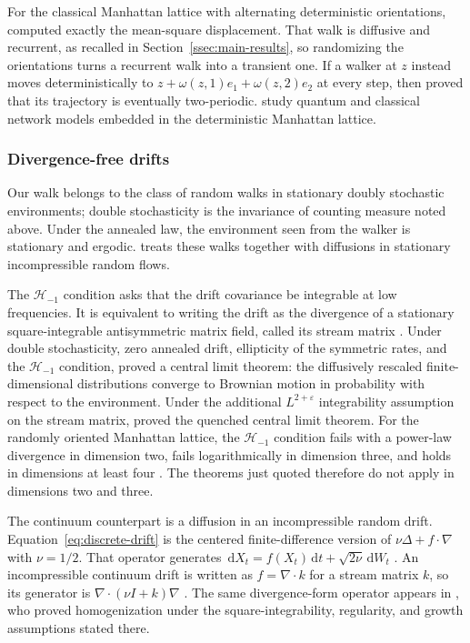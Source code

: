 \documentclass[11pt]{amsart}
\theoremstyle{plain}
\theoremstyle{definition}
\newcommand{\1}{\mathbf 1}
\newcommand{\dd}{\,\mathrm d}
\newcommand{\Hs}{\mathcal H}
\begin{document}
For  the classical Manhattan lattice with  alternating deterministic orientations, \citet*[Theorem~1]{BH23}
computed exactly the mean-square displacement.    That walk is
diffusive and recurrent, as recalled in Section~\ref{ssec:main-results}, so randomizing the orientations turns a recurrent walk into a transient one.  If a walker at $z$ instead moves deterministically to
$z+\omega(z,1)e_1+\omega(z,2)e_2$ at every step, then
\citet*[Theorem~1]{CHT19} proved that its trajectory is eventually
two-periodic.
\citet*[pp.~10251--10254]{BOC03}
study quantum and classical network models embedded in the deterministic
Manhattan lattice.

\subsubsection{Divergence-free drifts}\label{sssec:divfree}

Our walk belongs to the class of random walks in stationary doubly
stochastic environments; double stochasticity is the invariance of counting
measure noted above.
Under the annealed law, the environment seen from the walker is stationary
and ergodic.  \citet*[Sections~1.1--1.2]{Tot18} treats these walks together
with diffusions in stationary incompressible random flows.

The $\Hs_{-1}$ condition asks that the drift covariance be integrable at low
frequencies.  It is equivalent to writing the drift as the divergence of a
stationary square-integrable antisymmetric matrix field, called its stream
matrix \citep*[Proposition~1\textup{(ii)}]{Tot18}.  Under
double stochasticity, zero annealed drift, ellipticity of the symmetric
rates, and the $\Hs_{-1}$ condition, \citet*[Theorem~1]{KT17} proved a central
limit theorem: the diffusively rescaled finite-dimensional distributions
converge to Brownian motion in probability with respect to the environment.  Under the additional
$L^{2+\varepsilon}$ integrability assumption on the stream matrix,
\citet*[Theorem~1\textup{(ii)}]{Tot18Q} proved the quenched central limit
theorem.  For the randomly oriented Manhattan lattice, the $\Hs_{-1}$
condition fails with a power-law divergence in dimension two, fails
logarithmically in dimension three, and holds in dimensions at least four
\citep*[Section~1.4]{Tot18}.  The theorems just quoted therefore do not apply
in dimensions two and three.

The continuum counterpart is a diffusion in an incompressible random drift.
Equation~\eqref{eq:discrete-drift} is the centered finite-difference version
of $\nu\Delta+f\cdot\nabla$ with $\nu=1/2$.  That operator generates
$\dd X_t=f(X_t)\dd t+\sqrt{2\nu}\dd W_t$
\citep*[(1.1)]{ABK26}.  An incompressible continuum drift is
written as $f=\nabla\cdot k$ for a stream matrix $k$, so its
generator is $\nabla\cdot(\nu I+k)\nabla$
\citep*[(1.9)]{ABK26}.  The same divergence-form operator appears in
\citet*[Theorem~1 and (1.2)--(1.5)]{Oel88}, who proved homogenization under
the square-integrability, regularity, and growth assumptions stated there.
\end{document}
